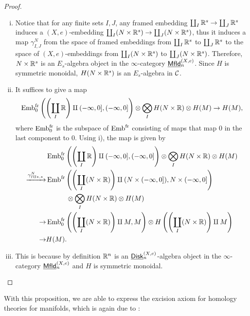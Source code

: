 \documentclass[twoside]{article}
\begin{document}
\begin{proof}
    \begin{enumerate}[i)]
        \item Notice that for any finite sets $I,J$, any framed embedding 
        $\coprod_I\mathbb{R}^s\to\coprod_J\mathbb{R}^s$ induces a $(X,e)$-embedding
        $\coprod_I(N\times\mathbb{R}^s)\to\coprod_J(N\times\mathbb{R}^s)$, thus it induces a map 
        $\gamma_{I,J}^N$ from the space of framed embeddings from $\coprod_I\mathbb{R}^s$ to
        $\coprod_J\mathbb{R}^s$ to the space of $(X,e)$-embeddings from 
        $\coprod_I(N\times\mathbb{R}^s)$ to $\coprod_J(N\times\mathbb{R}^s)$. Therefore, $N\times\mathbb{R}^s$
        is an $E_s$-algebra object in the $\infty$-category $\underline{\smash{\mathsf{Mfld}}}_n^{(X,e)}$. Since $H$ 
        is symmetric monoidal, $H(N\times\mathbb{R}^s)$ is an $E_s$-algebra in $\cal C$.

        \item It suffices to give a map $$\operatorname{Emb}^{\mathrm{fr}}_0\left(\left(\coprod_I\mathbb{R}\right)
        \amalg(-\infty,0],(-\infty,0]\right)\otimes\bigotimes\limits_IH(N\times\mathbb{R})\otimes H(M)\to H(M),$$
        where $\operatorname{Emb}^{\mathrm{fr}}_0$ is the subspace of $\operatorname{Emb}^{\mathrm{fr}}$ consisting of maps
        that map $0$ in the last component to $0$. Using i), the map is given by
        $$\begin{aligned}&\operatorname{Emb}^{\mathrm{fr}}_0\left(\left(\coprod_I\mathbb{R}\right)\amalg(-\infty,0],(-\infty,0]\right)
        \otimes\bigotimes\limits_IH(N\times\mathbb{R})\otimes H(M)\\\xrightarrow{\gamma^N_{I\amalg*,*}}&
        \operatorname{Emb}^{\mathrm{fr}}\left(\left(\coprod_I(N\times\mathbb{R})\right)\amalg(N\times(-\infty,0]),
        N\times(-\infty,0]\right)\\&\hspace{3em}\otimes\bigotimes\limits_IH(N\times\mathbb{R})\otimes H(M)\\\to&\operatorname{Emb}^{\mathrm{fr}}_0
        \left(\left(\coprod_I(N\times\mathbb{R})\right)\amalg M,M\right)\otimes H\left(\left(\coprod_I(N\times\mathbb{R})\right)
        \amalg M\right)\\\to& H(M).\end{aligned}$$

        \item This is because by definition $\mathbb{R}^n$ is an $\underline{\smash{\mathsf{Disk}}}_n^{(X,e)}$-algebra
        object in the $\infty$-category $\underline{\smash{\mathsf{Mfld}}}_n^{(X,e)}$ and $H$ is symmetric monoidal.
    \end{enumerate}
\end{proof}

With this proposition, we are able to express the excision axiom for
homology theories for manifolds, which is again due to \cite{Gin13}:
\end{document}
